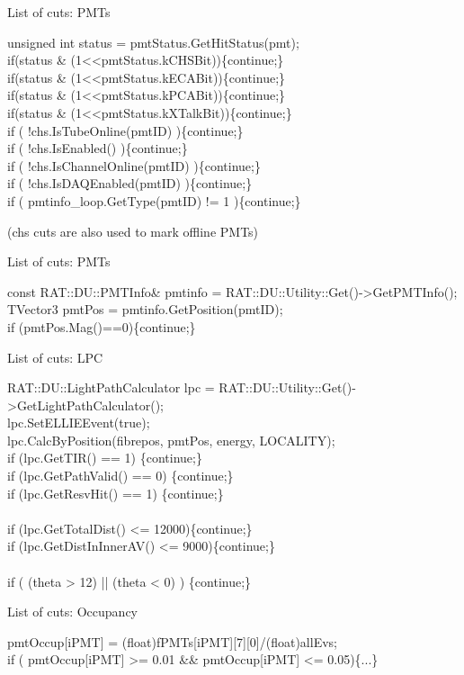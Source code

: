 \documentclass[xcolor=table]{beamer}
\begin{document}
\begin{frame}{List of cuts: PMTs}
\begin{tcolorbox}
unsigned int status = pmtStatus.GetHitStatus(pmt);\\
if(status \& (1<<pmtStatus.kCHSBit))\{continue;\}\\
if(status \& (1<<pmtStatus.kECABit))\{continue;\}\\
if(status \& (1<<pmtStatus.kPCABit))\{continue;\}\\
if(status \& (1<<pmtStatus.kXTalkBit))\{continue;\}\\
if ( !chs.IsTubeOnline(pmtID) )\{continue;\}\\
if ( !chs.IsEnabled() )\{continue;\}\\
if ( !chs.IsChannelOnline(pmtID) )\{continue;\}\\
if ( !chs.IsDAQEnabled(pmtID) )\{continue;\}\\
if ( pmtinfo\_loop.GetType(pmtID) != 1 )\{continue;\}
\end{tcolorbox}
\center (chs cuts are also used to mark offline PMTs)
\end{frame}

\begin{frame}{List of cuts: PMTs}
\begin{tcolorbox}
const RAT::DU::PMTInfo\& pmtinfo = RAT::DU::Utility::Get()->GetPMTInfo();\\
TVector3 pmtPos = pmtinfo.GetPosition(pmtID);\\
if (pmtPos.Mag()==0)\{continue;\} 
\end{tcolorbox}
\end{frame}

\begin{frame}{List of cuts: LPC}
\begin{tcolorbox}
RAT::DU::LightPathCalculator lpc = RAT::DU::Utility::Get()->GetLightPathCalculator();\\
lpc.SetELLIEEvent(true);\\
lpc.CalcByPosition(fibrepos, pmtPos, energy, LOCALITY);\\
if (lpc.GetTIR() == 1) \{continue;\}\\
if (lpc.GetPathValid() == 0) \{continue;\}\\
if (lpc.GetResvHit() == 1) \{continue;\}  \\  \\
if (lpc.GetTotalDist() <= 12000)\{continue;\}\\
if (lpc.GetDistInInnerAV() <= 9000)\{continue;\}\\ \\
if ( (theta > 12) || (theta < 0) ) \{continue;\}
\end{tcolorbox}
\end{frame}

\begin{frame}{List of cuts: Occupancy}
\begin{tcolorbox}
pmtOccup[iPMT] = (float)fPMTs[iPMT][7][0]/(float)allEvs;\\
if ( pmtOccup[iPMT] >= 0.01 \&\& pmtOccup[iPMT] <= 0.05)\{...\}
\end{tcolorbox}
\end{frame}
\end{document}
